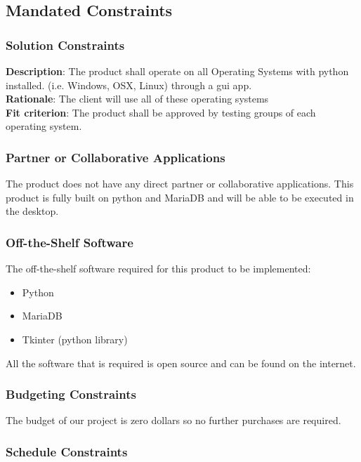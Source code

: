 \documentclass[12pt, titlepage]{article}
\begin{document}
\subsection{Mandated Constraints}

\subsubsection{Solution Constraints}

\textbf{Description}: The product shall operate on all Operating Systems with python installed. (i.e. Windows, OSX, Linux) through a gui app.
\\
\textbf{Rationale}: The client will use all of these operating systems
\\
\textbf{Fit criterion}: The product shall be approved by testing groups of each operating system.

\subsubsection{Partner or Collaborative Applications}

The product does not have any direct partner or collaborative applications. This product is fully built on python and MariaDB and will be able to be executed in the desktop.

\subsubsection{Off-the-Shelf Software}

The off-the-shelf software required for this product to be implemented:
\begin{itemize}
\item Python
\item MariaDB
\item Tkinter (python library)
\end{itemize}
All the software that is required is open source and can be found on the internet.

\subsubsection{Budgeting Constraints}

The budget of our project is zero dollars so no further purchases are required.

\subsubsection{Schedule Constraints}
\end{document}
